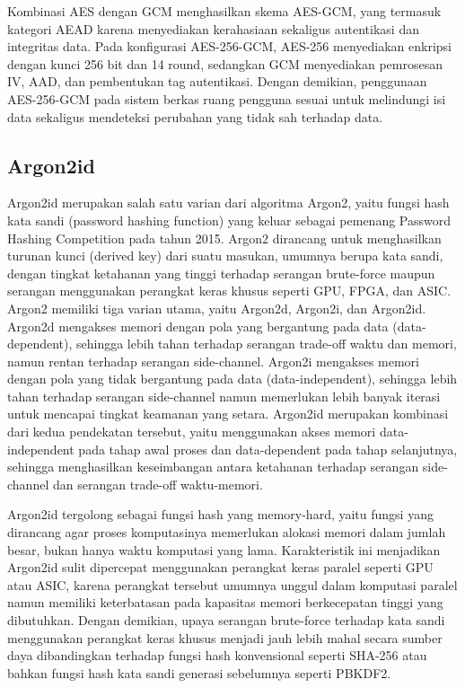 Kombinasi AES dengan GCM menghasilkan skema AES-GCM, yang termasuk kategori AEAD karena menyediakan kerahasiaan sekaligus autentikasi dan integritas data\cite{Anh2026Refining}. Pada konfigurasi AES-256-GCM, AES-256 menyediakan enkripsi dengan kunci 256 bit dan 14 round, sedangkan GCM menyediakan pemrosesan IV, AAD, dan pembentukan tag autentikasi. Dengan demikian, penggunaan AES-256-GCM pada sistem berkas ruang pengguna sesuai untuk melindungi isi data sekaligus mendeteksi perubahan yang tidak sah terhadap data\cite{Anh2026Refining}.

\subsection{Argon2id}
Argon2id merupakan salah satu varian dari algoritma Argon2, yaitu fungsi hash kata sandi (password hashing function) yang keluar sebagai pemenang Password Hashing Competition pada tahun 2015\cite{}. Argon2 dirancang untuk menghasilkan turunan kunci (derived key) dari suatu masukan, umumnya berupa kata sandi, dengan tingkat ketahanan yang tinggi terhadap serangan brute-force maupun serangan menggunakan perangkat keras khusus seperti GPU, FPGA, dan ASIC\cite{}. Argon2 memiliki tiga varian utama, yaitu Argon2d, Argon2i, dan Argon2id. Argon2d mengakses memori dengan pola yang bergantung pada data (data-dependent), sehingga lebih tahan terhadap serangan trade-off waktu dan memori, namun rentan terhadap serangan side-channel. Argon2i mengakses memori dengan pola yang tidak bergantung pada data (data-independent), sehingga lebih tahan terhadap serangan side-channel namun memerlukan lebih banyak iterasi untuk mencapai tingkat keamanan yang setara. Argon2id merupakan kombinasi dari kedua pendekatan tersebut, yaitu menggunakan akses memori data-independent pada tahap awal proses dan data-dependent pada tahap selanjutnya, sehingga menghasilkan keseimbangan antara ketahanan terhadap serangan side-channel dan serangan trade-off waktu-memori\cite{}.

Argon2id tergolong sebagai fungsi hash yang memory-hard, yaitu fungsi yang dirancang agar proses komputasinya memerlukan alokasi memori dalam jumlah besar, bukan hanya waktu komputasi yang lama\cite{}. Karakteristik ini menjadikan Argon2id sulit dipercepat menggunakan perangkat keras paralel seperti GPU atau ASIC, karena perangkat tersebut umumnya unggul dalam komputasi paralel namun memiliki keterbatasan pada kapasitas memori berkecepatan tinggi yang dibutuhkan. Dengan demikian, upaya serangan brute-force terhadap kata sandi menggunakan perangkat keras khusus menjadi jauh lebih mahal secara sumber daya dibandingkan terhadap fungsi hash konvensional seperti SHA-256 atau bahkan fungsi hash kata sandi generasi sebelumnya seperti PBKDF2\cite{}.

